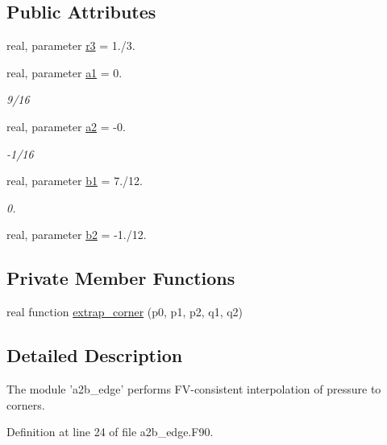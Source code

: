 \subsection*{Public Attributes}
\begin{DoxyCompactItemize}
\item 
real, parameter \hyperlink{classa2b__edge__mod_a719947b05e0bc96f78d35ea3cb071308}{r3} = 1./3.
\item 
real, parameter \hyperlink{classa2b__edge__mod_a45444d62264334d291e88df0b4c23811}{a1} = 0.
\begin{DoxyCompactList}\small\item\em 9/16 \end{DoxyCompactList}\item 
real, parameter \hyperlink{classa2b__edge__mod_a8155aee9a19fd9f7563377875f58fb0d}{a2} = -\/0.
\begin{DoxyCompactList}\small\item\em -\/1/16 \end{DoxyCompactList}\item 
real, parameter \hyperlink{classa2b__edge__mod_ab63bc73394b22152a35f0785c28d6d6f}{b1} = 7./12.
\begin{DoxyCompactList}\small\item\em 0. \end{DoxyCompactList}\item 
real, parameter \hyperlink{classa2b__edge__mod_aa319761122e25e2030a5652753d6a9ba}{b2} = -\/1./12.
\end{DoxyCompactItemize}
\subsection*{Private Member Functions}
\begin{DoxyCompactItemize}
\item 
real function \hyperlink{classa2b__edge__mod_ab5a8b8511c3ad957c5fab548ab663e30}{extrap\-\_\-corner} (p0, p1, p2, q1, q2)
\end{DoxyCompactItemize}


\subsection{Detailed Description}
The module 'a2b\-\_\-edge' performs F\-V-\/consistent interpolation of pressure to corners. 

Definition at line 24 of file a2b\-\_\-edge.\-F90.



